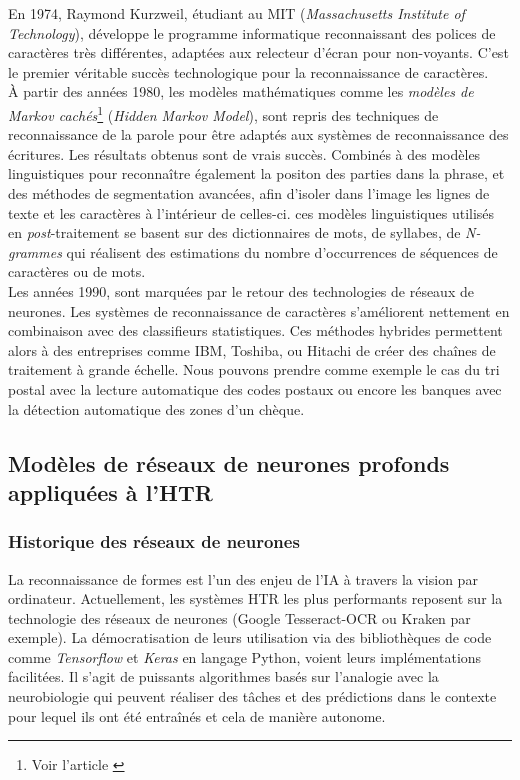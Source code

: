 En 1974, Raymond Kurzweil, étudiant au MIT (\textit{Massachusetts Institute of Technology}), développe le programme informatique reconnaissant des polices de caractères très différentes, adaptées aux relecteur d'écran pour non-voyants. C'est le premier véritable succès technologique pour la reconnaissance de caractères.\\ 

À partir des années 1980, les modèles mathématiques comme les \textit{modèles de Markov cachés}\footnote{Voir l'article \cite{noauthor_modemarkov_2019}} (\textit{Hidden Markov Model}), sont repris des techniques de reconnaissance de la parole pour être adaptés aux systèmes de reconnaissance des écritures. Les résultats obtenus sont de vrais succès. Combinés à des modèles linguistiques pour reconnaître également la positon des parties dans la phrase, et des méthodes de segmentation avancées, afin d'isoler dans l'image les lignes de texte et les caractères à l'intérieur de celles-ci. ces modèles linguistiques utilisés en \textit{post}-traitement se basent sur des dictionnaires de mots, de syllabes, de \textit{N-grammes} qui réalisent des estimations du nombre d'occurrences de séquences de caractères ou de mots.\\ 

Les années 1990, sont marquées par le retour des technologies de réseaux de neurones. Les systèmes de reconnaissance de caractères s'améliorent nettement en combinaison avec des classifieurs statistiques. Ces méthodes hybrides permettent alors à des entreprises comme IBM, Toshiba, ou Hitachi de créer des chaînes de traitement à grande échelle. Nous pouvons prendre comme exemple le cas du tri postal avec la lecture automatique des codes postaux ou encore les banques avec la détection automatique des zones d'un chèque.
\newpage
\subsection{Modèles de réseaux de neurones profonds appliquées à l'HTR}

\subsubsection{Historique des réseaux de neurones}
La reconnaissance de formes est l'un des enjeu de l'IA à travers la vision par ordinateur. Actuellement, les systèmes HTR les plus performants reposent sur la technologie des réseaux de neurones (Google Tesseract-OCR ou Kraken par exemple). La démocratisation de leurs utilisation via des bibliothèques de code comme \textit{Tensorflow} et \textit{Keras} en langage Python, voient leurs implémentations facilitées. Il s'agit de puissants algorithmes basés sur l'analogie avec la neurobiologie qui peuvent réaliser des tâches et des prédictions dans le contexte pour lequel ils ont été entraînés et cela de manière autonome.\\      

